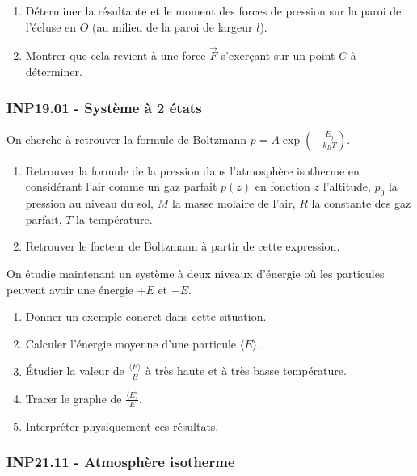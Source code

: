 \begin{enumerate}
\item Déterminer la résultante et le moment des forces de pression sur la paroi de l'écluse en $O$ (au milieu de la paroi de largeur $l$).
\item Montrer que cela revient à une force $\vec{F}$ s'exerçant sur un point $C$ à déterminer.
\end{enumerate}

\subsubsection*{INP19.01 - Système à 2 états }

On cherche à retrouver la formule de Boltzmann $p = A\exp(-\frac{E_{j}}{k_{B}T})$.

\begin{enumerate}
\item Retrouver la formule de la pression dans l'atmosphère isotherme en considérant l'air comme un gaz parfait $p(z)$ en fonction $z$ l'altitude, $p_{0}$ la pression au niveau du sol, $M$ la masse molaire de l'air, $R$ la constante des gaz parfait, $T$ la température.
\item Retrouver le facteur de Boltzmann à partir de cette expression.
\end{enumerate}

On étudie maintenant un système à deux niveaux d'énergie où les particules peuvent avoir une énergie $+E$ et $-E$.

\begin{enumerate}[resume]
\item Donner un exemple concret dans cette situation.
\item Calculer l'énergie moyenne d'une particule $\langle E \rangle$.
\item Étudier la valeur de $\frac{\langle E \rangle}{E}$ à très haute et à très basse température.
\item Tracer le graphe de $\frac{\langle E \rangle}{E}$.
\item Interpréter physiquement ces résultats.
\end{enumerate}

\newpage
\subsubsection*{INP21.11 - Atmosphère isotherme }

